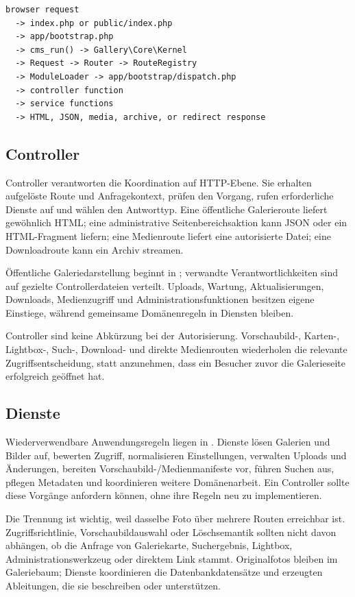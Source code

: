 \documentclass[11pt,a4paper]{article}
\newcommand{\filepath}[1]{\path{#1}}
\begin{document}
\begin{lstlisting}
browser request
  -> index.php or public/index.php
  -> app/bootstrap.php
  -> cms_run() -> Gallery\Core\Kernel
  -> Request -> Router -> RouteRegistry
  -> ModuleLoader -> app/bootstrap/dispatch.php
  -> controller function
  -> service functions
  -> HTML, JSON, media, archive, or redirect response
\end{lstlisting}

\subsection{Controller}

Controller verantworten die Koordination auf HTTP-Ebene. Sie erhalten aufgelöste
Route und Anfragekontext, prüfen den Vorgang, rufen erforderliche Dienste auf
und wählen den Antworttyp. Eine öffentliche Galerieroute liefert gewöhnlich
HTML; eine administrative Seitenbereichsaktion kann JSON oder ein HTML-Fragment
liefern; eine Medienroute liefert eine autorisierte Datei; eine Downloadroute
kann ein Archiv streamen.

Öffentliche Galeriedarstellung beginnt in
\filepath{app/controllers/public_gallery.php}; verwandte Verantwortlichkeiten
sind auf gezielte Controllerdateien verteilt. Uploads, Wartung,
Aktualisierungen, Downloads, Medienzugriff und Administrationsfunktionen
besitzen eigene Einstiege, während gemeinsame Domänenregeln in Diensten bleiben.

Controller sind keine Abkürzung bei der Autorisierung. Vorschaubild-, Karten-,
Lightbox-, Such-, Download- und direkte Medienrouten wiederholen die relevante
Zugriffsentscheidung, statt anzunehmen, dass ein Besucher zuvor die Galerieseite
erfolgreich geöffnet hat.

\subsection{Dienste}

Wiederverwendbare Anwendungsregeln liegen in \filepath{app/services/}. Dienste
lösen Galerien und Bilder auf, bewerten Zugriff, normalisieren Einstellungen,
verwalten Uploads und Änderungen, bereiten Vorschaubild-/Medienmanifeste vor,
führen Suchen aus, pflegen Metadaten und koordinieren weitere Domänenarbeit. Ein
Controller sollte diese Vorgänge anfordern können, ohne ihre Regeln neu zu
implementieren.

Die Trennung ist wichtig, weil dasselbe Foto über mehrere Routen erreichbar ist.
Zugriffsrichtlinie, Vorschaubildauswahl oder Löschsemantik sollten nicht davon
abhängen, ob die Anfrage von Galeriekarte, Suchergebnis, Lightbox,
Administrationswerkzeug oder direktem Link stammt. Originalfotos bleiben im
Galeriebaum; Dienste koordinieren die Datenbankdatensätze und erzeugten
Ableitungen, die sie beschreiben oder unterstützen.
\end{document}
